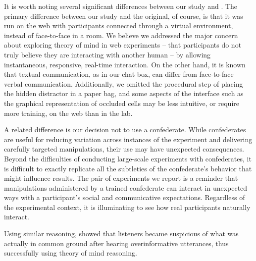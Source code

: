 \documentclass[manuscript]{stjour}
\begin{document}

It is worth noting several significant differences between our study and \cite{KeysarLinBarr03_LimitsOnTheoryOfMindUse}.
The primary difference between our study and the original, of course, is that it was run on the web with participants connected through a virtual environment, instead of face-to-face in a room. We believe we addressed the major concern about exploring theory of mind in web experiments -- that participants do not truly believe they are interacting with another human -- by allowing instantaneous, responsive, real-time interaction.  On the other hand, it is known that textual communication, as in our chat box, can differ from face-to-face verbal communication. Additionally, we omitted the procedural step of placing the hidden distractor in a paper bag, and some aspects of the interface such as the graphical representation of occluded cells may be less intuitive, or require more training, on the web than in the lab. %

A related difference is our decision not to use a confederate. While confederates are useful for reducing variation across instances of the experiment and delivering carefully targeted manipulations, their use may have unexpected consequences. Beyond the difficulties of conducting large-scale experiments with confederates, it is difficult to exactly replicate all the subtleties of the confederate's behavior that might influence results. The pair of experiments we report is a reminder that manipulations administered by a trained confederate can interact in unexpected ways with a participant's social and communicative expectations. Regardless of the experimental context, it is illuminating to see how real participants naturally interact.

Using similar reasoning, \cite{RubioFernandez16_DirectorTaskAttention} showed that listeners became suspicious of what was actually in common ground after hearing overinformative utterances, thus successfully using theory of mind reasoning. 
\end{document}
